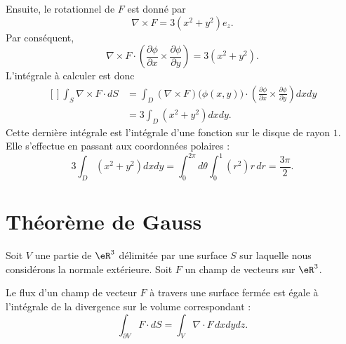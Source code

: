 \begin{example}
    Ensuite, le rotationnel de $F$ est donné par
    \begin{equation}
        \nabla\times F=3(x^2+y^2)e_z.
    \end{equation}
    Par conséquent,
    \begin{equation}
        \nabla\times F\cdot\left( \frac{ \partial \phi }{ \partial x }\times\frac{ \partial \phi }{ \partial y } \right)=3(x^2+y^2).
    \end{equation}
    L'intégrale à calculer est donc
    \begin{equation}
        \begin{aligned}[]
            \int_S\nabla\times F\cdot dS&=\int_D(\nabla\times F)\big( \phi(x,y) \big)\cdot\left( \frac{ \partial \phi }{ \partial x }\times\frac{ \partial \phi }{ \partial y } \right)dxdy\\
            &=3\int_D(x^2+y^2)dxdy.
        \end{aligned}
    \end{equation}
    Cette dernière intégrale est l'intégrale d'une fonction sur le disque de rayon $1$. Elle s'effectue en passant aux coordonnées polaires :
    \begin{equation}
        3\int_D(x^2+y^2)dxdy=\int_0^{2\pi}d\theta\int_0^1(r^2)r\,dr=\frac{ 3\pi }{2}.
    \end{equation}
\end{example}

\section{Théorème de Gauss}

Soit $V$ une partie de $\eR^3$ délimitée par une surface $S$ sur laquelle nous considérons la normale extérieure. Soit $F$ un champ de vecteurs sur $\eR^3$.

\begin{theorem}
    Le flux d'un champ de vecteur $F$ à travers une surface fermée est égale à l'intégrale de la divergence sur le volume correspondant :
    \begin{equation}
        \int_{\partial V} F\cdot dS=\int_V\nabla\cdot F\,dxdydz.
    \end{equation}
\end{theorem}

